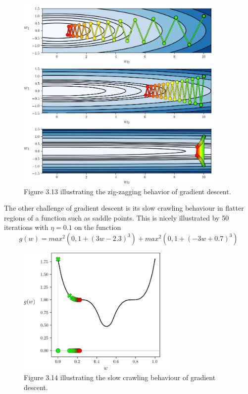 \documentclass{article}
\theoremstyle{definition}
\begin{document}
\begin{figure}[H]
    \centering
    \includegraphics[width=0.9\textwidth]{Project2/figures/Gradient_descent_zigzag.jpeg}
    \caption{Figure 3.13 \cite[p.~68]{MLRefined} illustrating the zig-zagging behavior
of gradient descent.}
    \label{fig:zigzagGradientDescent}
\end{figure}

The other challenge of gradient descent is its slow crawling behaviour in flatter regions of a function such as saddle points.  
This is nicely illustrated by 50 iterations with $\eta = 0.1$ on the function 
\[g(w) =  max^2(0, 1 + (3w - 2.3)^3) + max^2(0, 1 + (-3w + 0.7)^3)\]

\begin{figure}[H]
    \centering
    \includegraphics[width=0.7\textwidth]{Project2/figures/Gradient_descent_saddle_crawl.jpeg}
    \caption{Figure 3.14 \cite[p.~70]{MLRefined} illustrating the slow crawling behaviour
of gradient descent.}
    \label{fig:CrawlGradientDescent}
\end{figure}
\end{document}

